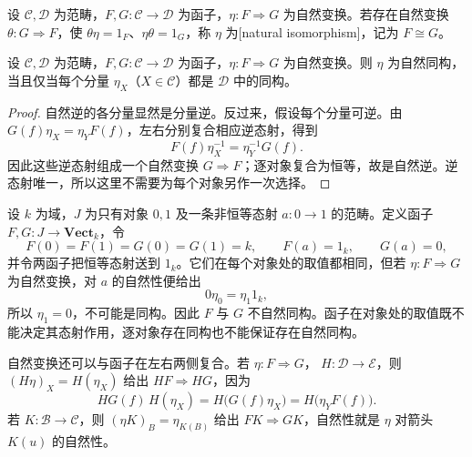 \begin{definition}\label{b4:def:natural-isomorphism}
	设 \(\mathcal C,\mathcal D\) 为范畴，\(F,G:\mathcal C\rightarrow\mathcal D\) 为函子，\(\eta:F\Rightarrow G\) 为自然变换。若存在自然变换 \(\theta:G\Rightarrow F\)，使 \(\theta\eta=1_F\)、\(\eta\theta=1_G\)，称 \(\eta\) 为[natural isomorphism]，记为 \(F\cong G\)。
\end{definition}

\begin{proposition}\label{b4:prop:natural-iso-components}
	设 \(\mathcal C,\mathcal D\) 为范畴，\(F,G:\mathcal C\rightarrow\mathcal D\) 为函子，\(\eta:F\Rightarrow G\) 为自然变换。则 \(\eta\) 为自然同构，当且仅当每个分量 \(\eta_X\)（\(X\in\mathcal C\)）都是 \(\mathcal D\) 中的同构。
\end{proposition}
\begin{proof}
	自然逆的各分量显然是分量逆。反过来，假设每个分量可逆。由 \(G(f)\eta_X=\eta_YF(f)\)，左右分别复合相应逆态射，得到
	\[
		F(f)\eta_X^{-1}=\eta_Y^{-1}G(f).
	\]
	因此这些逆态射组成一个自然变换 \(G\Rightarrow F\)；逐对象复合为恒等，故是自然逆。逆态射唯一，所以这里不需要为每个对象另作一次选择。
\end{proof}

\begin{example}\label{b4:exm:objectwise-iso-not-natural}
	设 \(k\) 为域，\(J\) 为只有对象 \(0,1\) 及一条非恒等态射 \(a:0\rightarrow1\) 的范畴。定义函子 \(F,G:J\rightarrow\mathbf{Vect}_k\)，令
	\[
		F(0)=F(1)=G(0)=G(1)=k,\qquad F(a)=1_k,\qquad G(a)=0,
	\]
	并令两函子把恒等态射送到 \(1_k\)。它们在每个对象处的取值都相同，但若 \(\eta:F\Rightarrow G\) 为自然变换，对 \(a\) 的自然性便给出
	\[
		0\eta_0=\eta_1 1_k,
	\]
	所以 \(\eta_1=0\)，不可能是同构。因此 \(F\) 与 \(G\) 不自然同构。函子在对象处的取值既不能决定其态射作用，逐对象存在同构也不能保证存在自然同构。
\end{example}

自然变换还可以与函子在左右两侧复合。若 \(\eta:F\Rightarrow G\)， \(H:\mathcal D\rightarrow\mathcal E\)，则 \((H\eta)_X=H(\eta_X)\) 给出 \(HF\Rightarrow HG\)，因为
\[
	HG(f)\,H(\eta_X) =H\bigl(G(f)\eta_X\bigr) =H\bigl(\eta_YF(f)\bigr).
\]
若 \(K:\mathcal B\rightarrow\mathcal C\)，则 \((\eta K)_B=\eta_{K(B)}\) 给出 \(FK\Rightarrow GK\)，自然性就是 \(\eta\) 对箭头 \(K(u)\) 的自然性。

